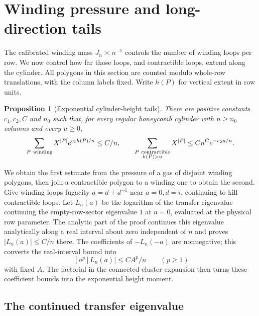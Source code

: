 \documentclass[11pt]{article}
\numberwithin{equation}{section}
\newtheorem{proposition}[theorem]{Proposition}
\theoremstyle{definition}\newtheorem{definition}[theorem]{Definition}
\theoremstyle{remark}\newtheorem{remark}[theorem]{Remark}
\begin{document}
\section{Winding pressure and long-direction tails}\label{L:part5}

The calibrated winding mass $J_n\asymp n^{-1}$ controls the number of
winding loops per row. We now control how far those loops, and
contractible loops, extend along the cylinder. All polygons in this
section are counted modulo whole-row translations, with the column
labels fixed. Write $h(P)$ for vertical extent in row units.

\begin{proposition}[Exponential cylinder-height tails]
\label{L:prop:cylinder-height-tail}
There are positive constants $c_1,c_2,C$ and $n_0$ such that, for every
regular honeycomb cylinder with $n\ge n_0$ columns and every $u\ge0$,
\begin{equation}\label{L:eq:cylinder-height-tail}
 \sum_{P\ {\rm winding}} X^{|P|}e^{c_1h(P)/n}\le C/n,
 \qquad
 \sum_{\substack{P\ {\rm contractible}\\h(P)>u}}X^{|P|}
       \le C n^C e^{-c_2u/n}.
\end{equation}
\end{proposition}

We obtain the first estimate from the pressure of a gas of disjoint
winding polygons, then join a contractible polygon to a winding one to
obtain the second. Give winding loops fugacity $a=d+d^{-1}$ near
$a=0,d=i$, continuing to kill contractible loops. Let $L_n(a)$ be the
logarithm of the transfer eigenvalue continuing the empty-row-sector
eigenvalue $1$ at $a=0$, evaluated at the physical row parameter.
The analytic part of the proof continues this eigenvalue analytically
along a real interval about zero independent of $n$ and proves
$|L_n(a)|\le C/n$ there. The coefficients of $-L_n(-a)$ are
nonnegative; this converts the real-interval bound into
\[
 |[a^p]L_n(a)|\le C A^p/n \qquad(p\ge1)
\]
with fixed $A$. The factorial in the connected-cluster expansion then
turns these coefficient bounds into the exponential height moment.

\subsection{The continued transfer eigenvalue}
\end{document}
